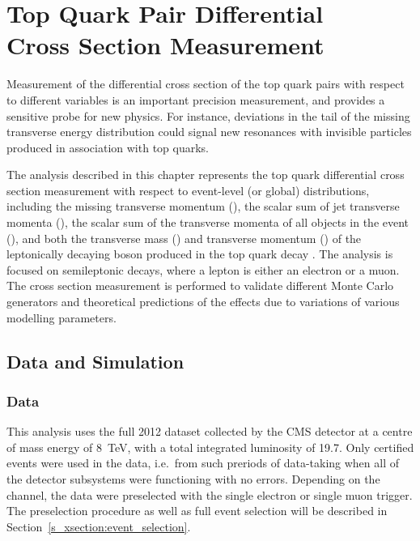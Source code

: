 
\chapter[Top Quark Pair Differential Cross Section Measurement]{Top Quark Pair Differential \\Cross Section Measurement}
\label{c:xsection_analysis}
\ifpdf
    \graphicspath{{06_Cross_section_analysis/plots/}}
\else
    \graphicspath{{06_Cross_section_analysis/plots/EPS/}{06_Cross_section_analysis/plots/}}
\fi

Measurement of the differential cross section of the top quark pairs with respect to different variables is an important
precision measurement, and provides a sensitive probe for new physics. For instance, deviations in the tail of the
missing transverse energy distribution could signal new resonances with invisible particles produced in association with
top quarks.

The analysis described in this chapter represents the top quark differential cross section measurement with respect to
event-level (or global) distributions, including the missing transverse momentum (\MET), the scalar sum of jet
transverse momenta (\HT), the scalar sum of the transverse momenta of all objects in the event (\ST), and both the
transverse mass (\MT) and transverse momentum (\WPT) of the leptonically decaying \W boson produced in the top quark
decay \autocite{xsection_PAS_7TeV, xsection_PAS_8TeV}. The analysis is focused on semileptonic \ttbar decays, where a
lepton is either an electron or a muon. The cross section measurement is performed to validate different Monte Carlo
generators and theoretical predictions of the effects due to variations of various modelling parameters.

\section{Data and Simulation}
\label{s_xsection:data_and_simulation}

\subsection{Data}
\label{ss_xsection:data}
This analysis uses the full 2012 dataset collected by the CMS detector at a centre of mass energy of \SI{8}{\TeV}, with
a total integrated luminosity of \SI{19.7}{\fbinv}. Only certified events were used in the data, i.e.\ from such
preriods of data-taking when all of the detector subsystems were functioning with no errors. Depending on the channel,
the data were preselected with the single electron or single muon trigger. The preselection procedure as well as full
event selection will be described in Section~\ref{s_xsection:event_selection}.

